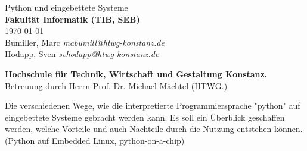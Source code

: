 \begin{titlepage}
	\vspace*{7cm}
	\begin{center}
		\Huge
		Python und eingebettete Systeme\\
		\vspace{1cm}
		\large
		\textbf{Fakultät Informatik (TIB, SEB)}\\
		\today\\
		\vspace{2cm}
		Bumiller, Marc \emph{mabumill@htwg-konstanz.de}\\
		Hodapp, Sven \emph{svhodapp@htwg-konstanz.de}\\
	\end{center}
	\normalsize
	\vfill
	\textbf{Hochschule für Technik, Wirtschaft und Gestaltung Konstanz.} Betreuung durch Herrn Prof. Dr. Michael Mächtel (HTWG.) 

Die verschiedenen Wege, wie die interpretierte Programmiersprache "python" auf eingebettete Systeme gebracht werden kann. Es soll ein Überblick geschaffen werden, welche Vorteile und auch Nachteile durch die Nutzung entstehen können. (Python auf Embedded Linux, python-on-a-chip)

\end{titlepage}
